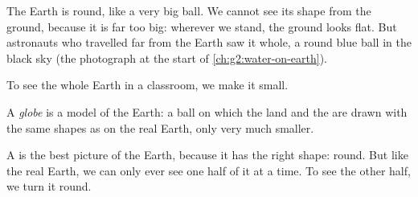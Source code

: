 The Earth is round, like a very big ball. We cannot see its shape from the
ground, because it is far too big: wherever we stand, the ground looks
flat. But astronauts who travelled far from the Earth saw it whole, a round
blue ball in the black sky (the photograph at the start of
\cref{ch:g2:water-on-earth}).

To see the whole Earth in a classroom, we make it small.

\begin{definition}[Globe]\label{def:g3:continents-and-oceans:globe}
A \emph{globe} is a model of the Earth: a ball on which the
land and the  are drawn with the same shapes as on the real Earth,
only very much smaller.
\end{definition}

A  is the best picture of the Earth, because it has the right shape:
round. But like the real Earth, we can only ever see one half of it at a
time. To see the other half, we turn it round.

